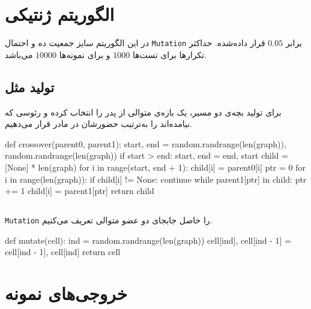 \section{الگوریتم ژنتیکی}
در این الگوریتم سایز جمعیت ده و احتمال
\verb;Mutation;
برابر
$0.05$
قرار داده‌شده.
حداکثر تکرارها برای تست‌ها 
$1000$
و برای نمونه‌ها
$10000$
می‌باشد.


\subsection{تولید مثل}
برای تولید بچه‌ی دو مسیر، یک بازه‌ی متوالی از پدر را انتخاب کرده و رئوسی که نیامده‌اند را به‌ترتیب حضورشان در مادر قرار می‌دهیم.

\begin{latin}
\begin{python}
    def crossover(parent0, parent1):
        start, end = random.randrange(len(graph)), random.randrange(len(graph))
        if start > end:
            start, end = end, start
        child = [None] * len(graph)
        for i in range(start, end + 1):
            child[i] = parent0[i]
        ptr = 0
        for i in range(len(graph)):
            if child[i] != None:
                continue
            while parent1[ptr] in child:
                ptr += 1
            child[i] = parent1[ptr]
        return child

\end{python}
\end{latin}

\subsection{}
\verb;Mutation;
را حاصل جابجای دو عضو متوالی تعریف می‌کنیم.

\begin{latin}
\begin{python}
     def mutate(cell):
        ind = random.randrange(len(graph))
        cell[ind], cell[ind - 1] = cell[ind - 1], cell[ind]
        return cell

\end{python}
\end{latin}

\section{خروجی‌های نمونه}


